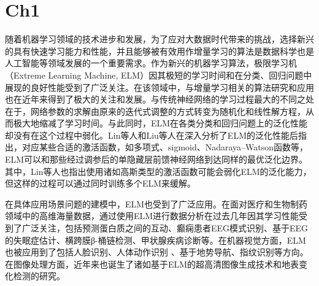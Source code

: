 \section{Ch1}
随着机器学习领域的技术进步和发展，为了应对大数据时代带来的挑战，选择新兴的具有快速学习能力和性能，并且能够被有效用作增量学习的算法是数据科学也是人工智能等领域发展的一个重要需求。作为新兴的机器学习算法，极限学习机（Extreme Learning Machine, ELM）因其极短的学习时间和在分类、回归问题中展现的良好性能受到了广泛关注。在该领域中，与增量学习相关的算法研究和应用也在近年来得到了极大的关注和发展。与传统神经网络的学习过程最大的不同之处在于，网络参数的求解由原来的迭代式调整的方式转变为随机化和线性解方程，从而极大地缩减了学习时间。与此同时，ELM在各类分类和回归问题上的泛化性能却没有在这个过程中弱化。Lin等人和Liu等人在深入分析了ELM的泛化性能后指出，对应某些合适的激活函数，如多项式、sigmoid、Nadaraya–Watson函数等，ELM可以和那些经过调参后的单隐藏层前馈神经网络到达同样的最优泛化边界。其中，Lin等人也指出使用诸如高斯类型的激活函数可能会弱化ELM的泛化能力，但这样的过程可以通过同时训练多个ELM来缓解。


在具体应用场景问题的建模中，ELM也受到了广泛应用。在面对医疗和生物制药领域中的高维海量数据，通过使用ELM进行数据分析在过去几年因其学习性能受到了广泛关注，包括预测蛋白质之间的互动、癫痫患者EEG模式识别、基于EEG的失眠症估计、横跨膜β-桶链检测、甲状腺疾病诊断等。在机器视觉方面，ELM也被应用到了包括人脸识别、人体动作识别
、基于地势导航、指纹识别等方向。在图像处理方面，近年来也诞生了诸如基于ELM的超高清图像生成技术和地表变化检测的研究。

